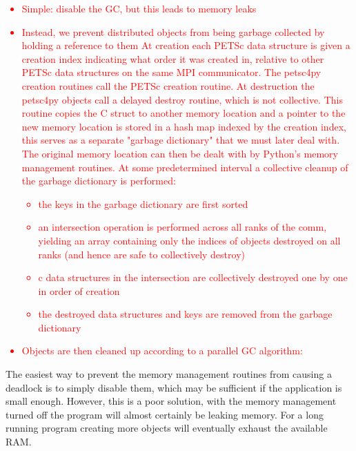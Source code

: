 \documentclass[10pt,journal,compsoc]{IEEEtran}
\newcommand{\jacknotes}[1]{\textcolor{red}{#1}}
\begin{document}
\jacknotes{
\begin{itemize}
	\item Simple: disable the GC, but this leads to memory leaks
	\item Instead, we prevent distributed objects from being garbage collected by holding a reference to them
	At creation each PETSc data structure is given a creation index indicating what order it was created in, relative to other PETSc data structures on the same MPI communicator. The petsc4py creation routines call the PETSc creation routine.
	At destruction the petsc4py objects call a delayed destroy routine, which is not collective.
	This routine copies the C struct to another memory location and a pointer to the new memory location is stored in a hash map indexed by the creation index, this serves as a separate "garbage dictionary" that we must later deal with.
	The original memory location can then be dealt with by Python's memory management routines.
	At some predetermined interval a collective cleanup of the garbage dictionary is performed:
	\begin{itemize}
	\item the keys in the garbage dictionary are first sorted
	\item an intersection operation is performed across all ranks of the comm, yielding an array containing only the indices of objects destroyed on all ranks (and hence are safe to collectively destroy)
	\item c data structures in the intersection are collectively destroyed one by one in order of creation
	\item the destroyed data structures and keys are removed from the garbage dictionary
\end{itemize}
	\item Objects are then cleaned up according to a parallel GC algorithm:
\end{itemize}
}

The easiest way to prevent the memory management routines from causing a deadlock is to simply disable them, which may be sufficient if the application is small enough. However, this is a poor solution, with the memory management turned off the program will almost certainly be leaking memory. For a long running program creating more objects will eventually exhaust the available RAM.
\end{document}
